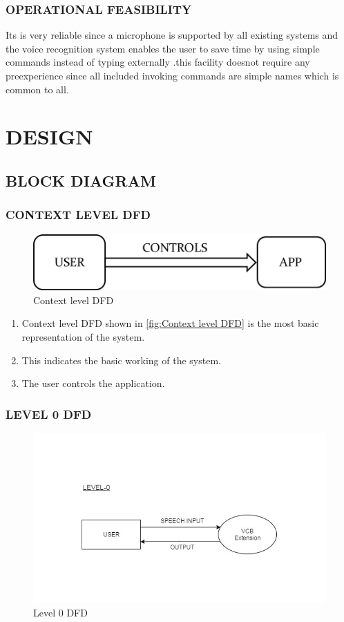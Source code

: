 \documentclass[11pt]{report} %
\begin{document}
\subsection{OPERATIONAL FEASIBILITY}
\label{subsec:OPERATIONAL FEASIBILITY}
Its is very reliable since a microphone is supported by all existing systems and the voice recognition system enables the user to save time by using simple commands instead of typing externally .this facility doesnot  require  any preexperience since all included invoking commands are simple names which is common to all.


\chapter{DESIGN}
\label{cha:DESIGN}


\section{BLOCK DIAGRAM}
\label{sec:DATA FLOW DIAGRAMS}

\subsection{CONTEXT LEVEL DFD}
\label{subsec:CONTEXT LEVEL DFD}

\begin{figure}[h]
	\centering
	\includegraphics[width=0.5\linewidth]{figures/context_level_DFD.png}
	\caption{Context level DFD}
	\label{fig:Context level DFD}
\end{figure}


\begin{enumerate}
	\item Context level DFD shown in \autoref{fig:Context level DFD} is the most basic representation of the system.
	\item This indicates the basic working of the system.
	\item The user controls the application.
\end{enumerate}


\subsection{LEVEL 0 DFD}
\label{subsec:LEVEL 0 DFD}
\begin{figure}[h]
	\centering
	\includegraphics[width=0.5\linewidth]{figures/DFD0.jpg}
	\caption{Level 0 DFD}
	\label{fig:Level 0 DFD}
\end{figure}
\end{document}
